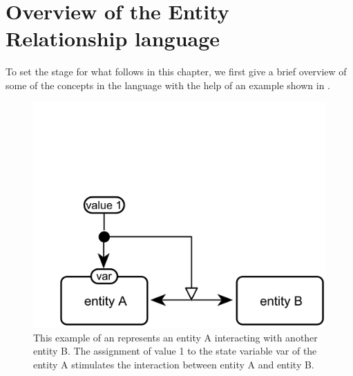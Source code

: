 
\section{Overview of the Entity Relationship language}\label{sec:overview}

To set the stage for what follows in this chapter, we first give a brief overview of some of the concepts in the \ER language with the help of an example shown in . 

\begin{figure}[H]
  \centering
  \vspace*{-0.75em}
  \includegraphics[scale=0.45]{examples/HelloWorld}
   \caption{This example of an \ERm represents an entity A interacting with another entity B. The assignment of value 1 to the state variable var of the entity A stimulates the interaction between entity A and entity B.}
  \label{fig:eg1}
\end{figure}

